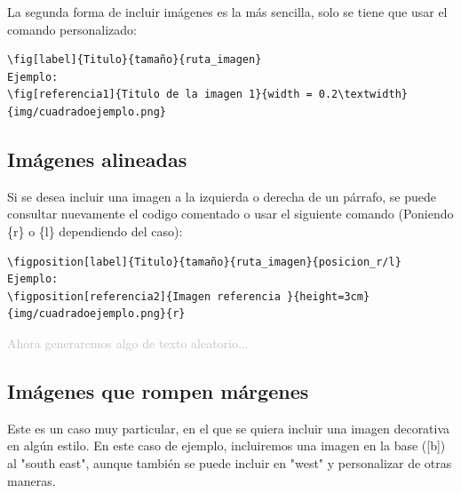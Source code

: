 La segunda forma de incluir imágenes es la más sencilla, solo se tiene que usar el comando personalizado:
\begin{verbatim} 
\fig[label]{Titulo}{tamaño}{ruta_imagen}
Ejemplo:
\fig[referencia1]{Titulo de la imagen 1}{width = 0.2\textwidth}{img/cuadradoejemplo.png}
\end{verbatim}



\subsection{Imágenes alineadas}
Si se desea incluir una imagen a la izquierda o derecha de un párrafo, se puede consultar nuevamente el codigo comentado o usar el siguiente comando (Poniendo \{r\} o \{l\} dependiendo del caso):
\begin{verbatim} 
\figposition[label]{Titulo}{tamaño}{ruta_imagen}{posicion_r/l}
Ejemplo:
\figposition[referencia2]{Imagen referencia }{height=3cm}{img/cuadradoejemplo.png}{r}
\end{verbatim}




\textcolor{silver}{
    Ahora generaremos algo de texto aleatorio...
    \lipsum[2]
}

\subsection{Imágenes que rompen márgenes}

Este es un caso muy particular, en el que se quiera incluir una imagen decorativa en algún estilo. En este caso de ejemplo, incluiremos una imagen en la base ([b]) al "south east", aunque también se puede incluir en "west" y personalizar de otras maneras.

